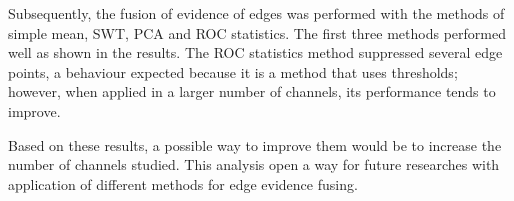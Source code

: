 \documentclass[conference]{IEEEtran}
\begin{document}
Subsequently, the fusion of evidence of edges was performed with the methods of simple mean, SWT, PCA and ROC statistics. The first three methods performed well as shown in the results. The ROC statistics method suppressed several edge points, a behaviour expected because it is a method that uses thresholds; however, when applied in a larger number of channels, its performance tends to improve. 

Based on these results, a possible way to improve them would be to increase the number of channels studied. This analysis open a way for future researches with application of different methods for edge evidence fusing.


\end{document}
